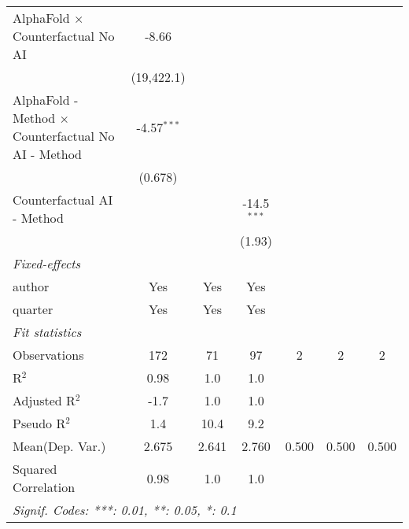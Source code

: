 \begin{tabular}{lcccccc}
   AlphaFold $\times$ Counterfactual No AI                    & -8.66         &                &               &     &     &   \\   
                                                              & (19,422.1)    &                &               &     &     &   \\   
   AlphaFold - Method $\times$ Counterfactual No AI - Method  & -4.57$^{***}$ &                &               &     &     &   \\   
                                                              & (0.678)       &                &               &     &     &   \\   
   Counterfactual AI - Method                                 &               &                & -14.5$^{***}$ &     &     &   \\   
                                                              &               &                & (1.93)        &     &     &   \\   
   \midrule
   \emph{Fixed-effects}\\
   author                                                     & Yes           & Yes            & Yes           &     &     & \\  
   quarter                                                    & Yes           & Yes            & Yes           &     &     & \\  
   \midrule
   \emph{Fit statistics}\\
   Observations                                               & 172           & 71             & 97            & 2   & 2   & 2\\  
   R$^2$                                                      & 0.98          & 1.0            & 1.0           &     &     & \\  
   Adjusted R$^2$                                             & -1.7          & 1.0            & 1.0           &     &     & \\  
   Pseudo R$^2$                                               & 1.4           & 10.4           & 9.2           &     &     & \\  
Mean(Dep. Var.) & 2.675 & 2.641 & 2.760 & 0.500 & 0.500 & 0.500 \\
   Squared Correlation                                        & 0.98          & 1.0            & 1.0           &     &     & \\  
   \midrule \midrule
   \multicolumn{7}{l}{\emph{Signif. Codes: ***: 0.01, **: 0.05, *: 0.1}}\\
\end{tabular}
\par\endgroup
